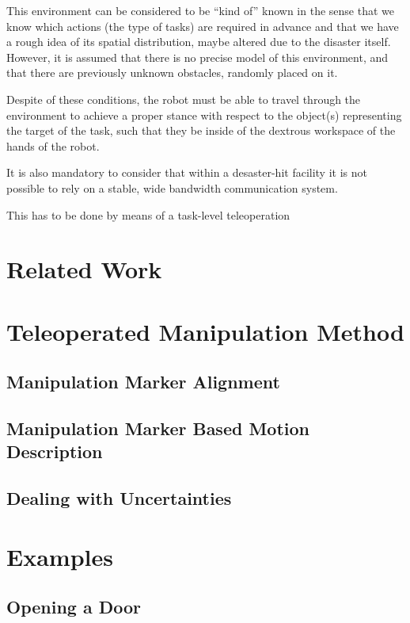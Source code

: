 \documentclass[letterpaper, 10 pt, conference]{ieeeconf}
\begin{document}
		This environment can be considered to be ``kind of'' known in the sense that we know which actions
		(the type of tasks)	are required in advance and that we have a rough idea of its spatial distribution,
		maybe altered due to the disaster itself.
		However, it is assumed that there is no precise model of this environment, and that there are previously unknown
		obstacles, randomly placed on it.
		
		Despite of these conditions, the robot must be able to travel through the environment to achieve a proper stance
		with respect to the object(s) representing the target of the task, such that they be inside of the dextrous
		workspace of the hands of the robot.
		
		It is also mandatory to consider that within a desaster-hit facility it is not possible to rely on a stable,
		wide bandwidth communication system.
		
		
		This has to be done by means of a task-level teleoperation
		
	\section{Related Work}
	
	\section{Teleoperated Manipulation Method}
	
		\subsection{Manipulation Marker Alignment}
		
		\subsection{Manipulation Marker Based Motion Description}
		
		\subsection{Dealing with Uncertainties}
		
	\section{Examples}
		
		\subsection{Opening a Door}
		
\end{document}
